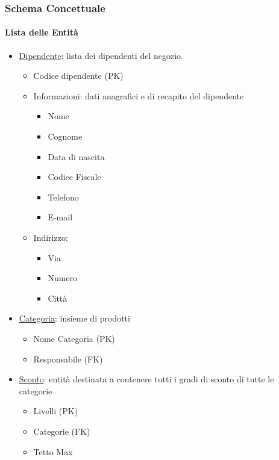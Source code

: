 \subsubsection{Schema Concettuale}

\paragraph*{Lista delle Entit\`a}

\begin{itemize}

\item \underline{Dipendente}: lista dei dipendenti del negozio.
  
  \begin{itemize}

  \item Codice dipendente (PK)
    
  \item Informazioni: dati anagrafici e di recapito del dipendente
    \begin{itemize}
    \item Nome
    \item Cognome
    \item Data di nascita
    \item Codice Fiscale
    \item Telefono
    \item E-mail
    \end{itemize}
    
  \item Indirizzo:
    \begin{itemize}
    \item Via
    \item Numero
    \item Citt\`a
    \end{itemize}

  \end{itemize}

\item \underline{Categoria}: insieme di prodotti
  \begin{itemize}
  \item Nome Categoria (PK)
  \item Responsabile (FK)
  \end{itemize}

\item \underline{Sconto}: entit\`a destinata a contenere tutti i gradi di sconto di tutte le categorie
  \begin{itemize}
  \item Livelli (PK)
  \item Categorie (FK)
  \item Tetto Max
  \end{itemize}


\end{itemize}
